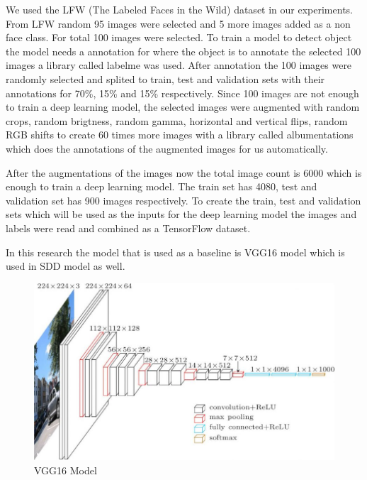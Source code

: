 \documentclass[conference]{IEEEtran}
\begin{document}
\bigskip

We used the LFW (The Labeled Faces in the Wild) dataset in our experiments.  From LFW random 95 images were selected and 5 more images added as a non face class. For total 100 images were selected. To train a model to detect object the model needs a annotation for where the object is to annotate the selected 100 images a library called labelme was used. After annotation the 100 images were randomly selected and splited to train, test and validation sets with their annotations for 70\%, 15\% and 15\% respectively. Since 100 images are not enough to train a deep learning model, the selected images were augmented with random crops, random brigtness, random gamma, horizontal and vertical flips, random RGB shifts to create 60 times more images with a library called albumentations which does the annotations of the augmented images for us automatically.

\bigskip

After the augmentations of the images now the total image count is 6000 which is enough to train a deep learning model. The train set has 4080, test and validation set has 900 images respectively. To create the train, test and validation sets which will be used as the inputs for the deep learning model the images and labels were read and combined as a TensorFlow dataset.

\bigskip

In this research the model that is used as a baseline is VGG16 model which is used in SDD model as well. 

\begin{figure}[htbp]
\centering
\includegraphics[scale=0.39]{VGG16-model.jpg}
\caption{VGG16 Model}
\label{fig:VGG16}
\end{figure}
\end{document}
